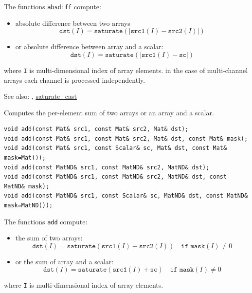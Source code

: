 The functions \texttt{absdiff} compute:
\begin{itemize}
    \item absolute difference between two arrays
    \[\texttt{dst}(I) = \texttt{saturate}(|\texttt{src1}(I) - \texttt{src2}(I)|)\]
    \item or absolute difference between array and a scalar:
    \[\texttt{dst}(I) = \texttt{saturate}(|\texttt{src1}(I) - \texttt{sc}|)\]
\end{itemize}
where \texttt{I} is multi-dimensional index of array elements.
in the case of multi-channel arrays each channel is processed independently.

See also: , \hyperref[saturatecast]{saturate\_cast}

\label{add}
Computes the per-element sum of two arrays or an array and a scalar.

\begin{lstlisting}
void add(const Mat& src1, const Mat& src2, Mat& dst);
void add(const Mat& src1, const Mat& src2, Mat& dst, const Mat& mask);
void add(const Mat& src1, const Scalar& sc, Mat& dst, const Mat& mask=Mat());
void add(const MatND& src1, const MatND& src2, MatND& dst);
void add(const MatND& src1, const MatND& src2, MatND& dst, const MatND& mask);
void add(const MatND& src1, const Scalar& sc, MatND& dst, const MatND& mask=MatND());
\end{lstlisting}
\begin{description}
\end{description}

The functions \texttt{add} compute:
\begin{itemize}
    \item the sum of two arrays:
    \[\texttt{dst}(I) = \texttt{saturate}(\texttt{src1}(I) + \texttt{src2}(I))\quad\texttt{if mask}(I)\ne0\]
    \item or the sum of array and a scalar:
    \[\texttt{dst}(I) = \texttt{saturate}(\texttt{src1}(I) + \texttt{sc})\quad\texttt{if mask}(I)\ne0\]
\end{itemize}
where \texttt{I} is multi-dimensional index of array elements.

